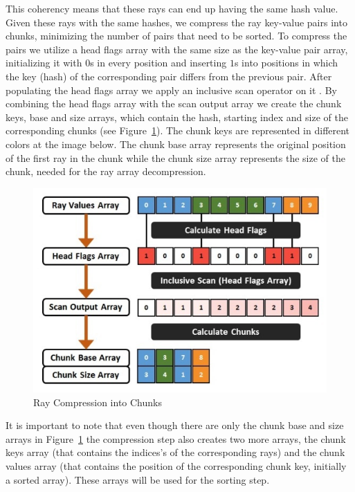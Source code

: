 This coherency means that these rays can end up having the same hash value. Given these rays with the same hashes, we compress the ray key-value pairs into chunks, minimizing the number of pairs that need to be sorted. To compress the pairs we utilize a head flags array with the same size as the key-value pair array, initializing it with $0$s in every position and inserting $1$s into positions in which the key (hash) of the corresponding pair differs from the previous pair. After populating the head flags array we apply an inclusive scan operator on it \cite{Merrill09}. By combining the head flags array with the scan output array we create the chunk keys, base and size arrays, which contain the hash, starting index and size of the corresponding chunks (see Figure~\ref{fig:rcc}). The chunk keys are represented in different colors at the image below. The chunk base array represents the original position of the first ray in the chunk while the chunk size array represents the size of the chunk, needed for the ray array decompression.

\begin{figure}[!htb]
    \centering
    \includegraphics[scale=0.75]{Images/Ray_Compression}
    \caption{\label{fig:rcc}Ray Compression into Chunks}
\end{figure}

It is important to note that even though there are only the chunk base and size arrays in Figure~\ref{fig:rcc} the compression step also creates two more arrays, the chunk keys array (that contains the indices's of the corresponding rays) and the chunk values array (that contains the position of the corresponding chunk key, initially a sorted array). These arrays will be used for the sorting step.

